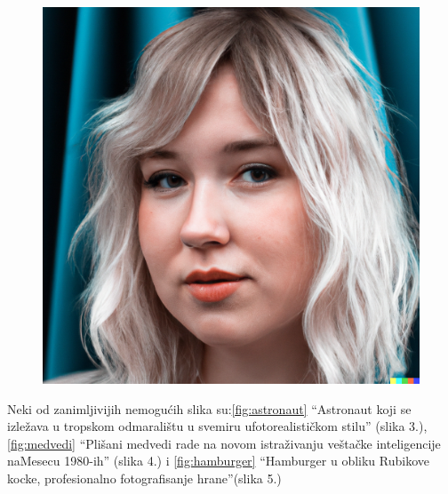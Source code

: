\documentclass[a4paper]{article}
\begin{document}
\begin{figure}[h!]
\begin{center}
\includegraphics[scale=0.75]{zena.jpg}
\end{center}
\label{fig:zena}
\end{figure}

Neki od zanimljivijih nemogućih slika su:\ref{fig:astronaut} “Astronaut koji se izležava u tropskom odmaralištu u svemiru ufotorealističkom stilu” (slika 3.), \ref{fig:medvedi} “Plišani medvedi rade na novom istraživanju veštačke inteligencije naMesecu 1980-ih” (slika 4.) i \ref{fig:hamburger} “Hamburger u obliku Rubikove kocke, profesionalno fotografisanje hrane”(slika 5.)
\end{document}
